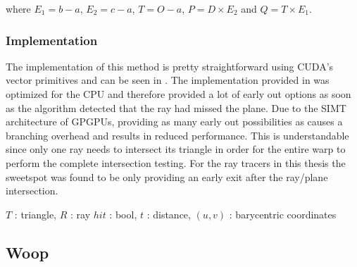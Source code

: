 where $E_1 = b - a$, $E_2 = c - a$, $T = O - a$, $P = D \times  E_2$
and $Q = T \times  E_1$.

\subsubsection{Implementation}

The implementation of this method is pretty straightforward using
CUDA's vector primitives and can be seen in
. The implementation provided in
 was optimized for the CPU and therefore
provided a lot of early out options as soon as the algorithm detected
that the ray had missed the plane. Due to the SIMT architecture of
GPGPUs, providing as many early out possibilities as
 causes a branching overhead and results in
reduced performance. This is understandable since only one ray needs
to intersect its triangle in order for the entire warp to perform the
complete intersection testing. For the ray tracers in this thesis the
sweetspot was found to be only providing an early exit after the
ray/plane intersection.

\begin{algorithm}
  \caption{Möller-Trumbore ray/triangle intersection test}
  \label{alg:moellerTrumbore}
  \begin{algorithmic}
              {$T$ : triangle, $R$ : ray}
              {$hit$ : bool, $t$ : distance, $(u,v)$ : barycentric coordinates}
              {
                \ELSE
                \ENDIF
              }
  \end{algorithmic}
\end{algorithm}

\subsection{Woop}

